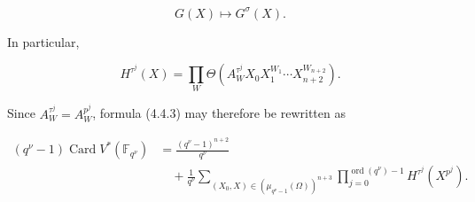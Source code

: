 \begin{equation}\tag{4.4.5}
G(X)\longmapsto G^\sigma(X).
\end{equation}

In particular,

\[
H^{\tau^j}(X)=\prod_W
\Theta\!\left(A_W^{\tau^j}X_0X_1^{W_1}\cdots
X_{n+2}^{W_{n+2}}\right).
\]

Since $A_W^{\tau^j}=A_W^{p^j}$, formula (4.4.3) may therefore be rewritten
as

\begin{equation}\tag{4.4.6}
\begin{aligned}
(q^\nu-1)\operatorname{Card}V^*(\mathbb F_{q^\nu})
&=\frac{(q^\nu-1)^{n+2}}{q^\nu}\\
&\quad+\frac1{q^\nu}
\sum_{(X_0,X)\in(\mu_{q^\nu-1}(\Omega))^{n+3}}
\prod_{j=0}^{\operatorname{ord}(q^\nu)-1}H^{\tau^j}(X^{p^j}).
\end{aligned}
\end{equation}
